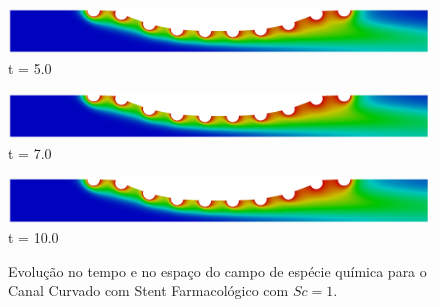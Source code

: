 \begin{figure}[H]
     \begin{minipage}{.50\linewidth}
      \centering
      \includegraphics[scale=0.12]{./02_chaps/cap_solution/figure/conc1_CurvedStrut10000.png}\\
      t = 5.0
     \end{minipage}
     \begin{minipage}{.50\linewidth}
     \medskip
      \centering
      \includegraphics[scale=0.12]{./02_chaps/cap_solution/figure/conc1_CurvedStrut14000.png}\\
      t = 7.0
     \end{minipage}%
     \begin{minipage}{.50\linewidth}
     \medskip
      \centering
      \includegraphics[scale=0.12]{./02_chaps/cap_solution/figure/conc1_CurvedStrut20000.png}\\
      t = 10.0
     \end{minipage}
     \medskip
     \caption{Evolução no tempo e no espaço do campo de espécie química para o Canal Curvado com Stent Farmacológico com $Sc=1$.}
     \label{conc field curved stent sc 1}
\end{figure}


